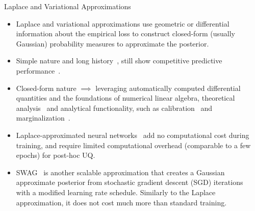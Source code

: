 \documentclass[9pt,handout]{beamer}
\begin{document}
\begin{frame}{Laplace and Variational Approximations}
\begin{itemize}[<+->]
	\item \alert{Laplace and variational approximations} use geometric or differential information about the empirical loss to construct closed-form (usually Gaussian) probability measures to approximate the posterior. 
	\item Simple nature and long history~\citep{mackay1992bayesian}, still show competitive predictive performance~\citep{daxberger2021a,rudner2022fsvi,antoran2023,rudner2023fseb}. 
	\item Closed-form nature $\implies$ leveraging automatically computed differential quantities and the foundations of numerical linear algebra, theoretical analysis~\citep{pmlr-v119-kristiadi20a} and analytical functionality, such as calibration~\citep{pmlr-v161-kristiadi21a,kristiadi2021infinite} and marginalization~\citep{khan2019approximate,immer2021scalable,pmlr-v130-immer21a}.
	\item \alert{Laplace-approximated neural networks}~\citep{ritter2018}  add no computational cost during training, and require limited computational overhead (comparable to a few epochs) for post-hoc UQ. %
	\item \alert{SWAG}~\citep{maddox2019simple} is another scalable approximation that creates a Gaussian approximate posterior from \alert{stochastic gradient descent (SGD)} iterations~\citep{mandt2017stochastic} with a modified learning rate schedule. Similarly to the Laplace approximation, it does not cost much more than standard training. 
\end{itemize}
\end{frame}
\end{document}
